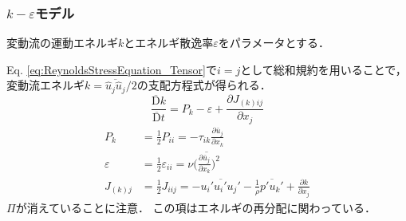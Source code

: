 \documentclass[12pt,a4paper]{jsarticle}
\begin{document}
\subsubsection{$k-\varepsilon$モデル}
\label{subsubsec:k-epsilonModel}

変動流の運動エネルギ$k$とエネルギ散逸率$\varepsilon$をパラメータとする．

Eq. \ref{eq:ReynoldsStressEquation_Tensor}で$i=j$として総和規約を用いることで，変動流エネルギ$k=\overline{\hat{u}_j \hat{u}_j}/2$の支配方程式が得られる．
\begin{equation}
  \frac{\overline{\mathrm{D}} k}{\overline{\mathrm{D}} t} = P_k -\varepsilon +\frac{\partial J_{(k)ij}}{\partial x_j}
  \label{eq:RANS_EnergyEquation} \tag{6.30}
\end{equation}
\begin{align}
  P_k &= \frac{1}{2}P_{ii} =-\tau_{ik} \frac{\partial \bar{u}_j}{\partial x_k} \tag{6.31} \\
  \varepsilon &= \frac{1}{2} \varepsilon_{ii} = \nu \overline{\Big( \frac{\partial \bar{u}_j}{\partial x_k} \Big)^2} \tag{6.32} \\
  J_{(k)j} &= \frac{1}{2}J_{iij} = -\overline{u_i' u_i' u_j'} -\frac{1}{\rho} \overline{p'u_k'} +\frac{\partial k}{\partial x_j} \tag{6.33~-~6.35}
\end{align}
$\Pi$が消えていることに注意．
この項はエネルギの再分配に関わっている．\\
\end{document}
